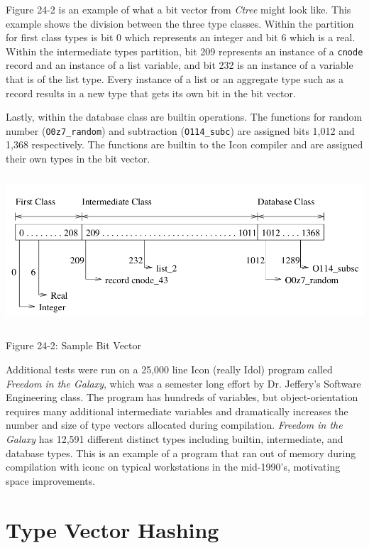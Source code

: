 Figure 24-2 is an example of what a bit vector from \textit{Ctree}
might look like. This example shows the division between the three
type classes. Within the partition for first class types is bit 0
which represents an integer and bit 6 which is a real. Within the
intermediate types partition, bit 209 represents an instance of a
\texttt{cnode} record and an instance of a list variable, and bit 232
is an instance of a variable that is of the list type. Every instance
of a list or an aggregate type such as a record results in a new type
that gets its own bit in the bit vector.

Lastly, within the database class are builtin operations. The
functions for random number (\texttt{O0z7\_random}) and subtraction
(\texttt{O114\_subc}) are assigned bits 1,012 and 1,368
respectively. The functions are builtin to the Icon compiler and are
assigned their own types in the bit vector.

\bigskip

\begin{center}
\includegraphics[width=6.0in,height=2.2in]{bit_sizes.png}

Figure 24-2: Sample Bit Vector
\end{center}

Additional tests were run on a 25,000 line Icon (really Idol) program
called \textit{Freedom in the Galaxy}, which was a semester long
effort by Dr. Jeffery's Software Engineering class. The program has
hundreds of variables, but object-orientation requires many additional
intermediate variables and dramatically increases the number and
size of type vectors allocated during compilation. \textit{Freedom in
the Galaxy} has 12,591 different distinct types including builtin,
intermediate, and database types. This is an example of a program that
ran out of memory during compilation with iconc on typical
workstations in the mid-1990's, motivating space improvements.

\section{Type Vector Hashing}

